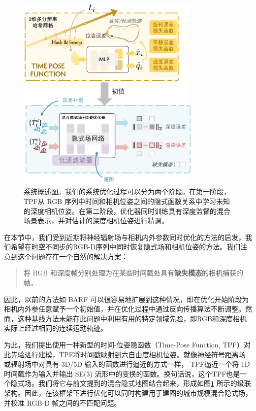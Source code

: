 \begin{figure}[t]
    \centering
    \includegraphics[width=0.8\textwidth]{undergraduate-thesis/images/time-pose function/main_export.pdf}
    \caption{系统概述图。我们的系统优化过程可以分为两个阶段。在第一阶段，TPF从 RGB 序列中时间和相机位姿之间的隐式函数关系中学习未知的深度相机位姿。在第二阶段，优化器同时训练具有深度监督的混合场景表示，并对估计的深度相机位姿进行精调。}
    \label{fig:time-pose function main figure}
\end{figure}

在本节中，我们受到近期将神经辐射场与相机内外参数同时优化的方法\cite{yen-chen_inerf_2021, lin_barf_2021, bian_nope-nerf_2022}的启发，我们希望在时空不同步的RGB-D序列中同时恢复隐式场和相机位姿的方法。我们注意到这个问题存在一个自然的解决方案：
\begin{quote}
    将 RGB 和深度帧分别处理为在某些时间戳处具有\textbf{缺失模态}的相机捕获的帧。
\end{quote}

因此，以前的方法如 BARF\cite{lin_barf_2021} 可以很容易地扩展到这种情况，即在优化开始阶段为相机内外参任意赋予一个初始值，并在优化过程中通过反向传播算法不断调整。然而，这种基线方法未能在此问题中利用有用的特定领域先验，即RGB和深度相机实际上经过相同的连续运动轨迹。

为此，我们提出使用一种新型的时间-位姿隐函数（Time-Pose Function, TPF）对此先验进行建模，TPF将时间戳映射到六自由度相机位姿。就像神经符号距离场或辐射场中对具有 3D/5D 输入的函数进行逼近的方式一样， TPF逼近一个将 1D 时间戳作为输入并输出 SE(3) 流形\cite{sola_micro_2021}中的变换的函数。换句话说，这个TPF也是一个隐式场。我们将它与前文提到的混合隐式地图结合起来，形成如图\ref{fig:time-pose function main figure} 所示的级联架构。因此，在该框架下进行优化可以同时构建用于建图的城市规模混合隐式场，并校准 RGB-D 帧之间的不匹配问题。


